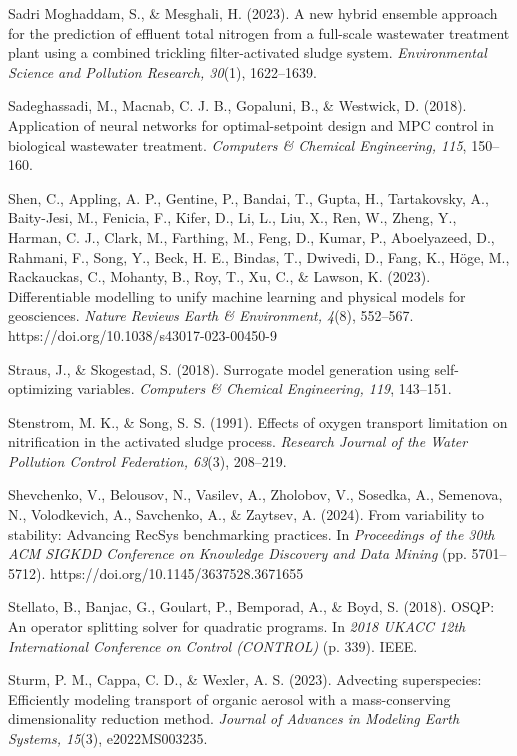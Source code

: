 \documentclass[a4paper,fleqn]{cas-sc}
\begin{document}
\noindent Sadri Moghaddam, S., \& Mesghali, H. (2023). A new hybrid ensemble approach for the prediction of effluent total nitrogen from a full-scale wastewater treatment plant using a combined trickling filter-activated sludge system. \textit{Environmental Science and Pollution Research, 30}(1), 1622--1639.

\noindent Sadeghassadi, M., Macnab, C. J. B., Gopaluni, B., \& Westwick, D. (2018). Application of neural networks for optimal-setpoint design and MPC control in biological wastewater treatment. \textit{Computers \& Chemical Engineering, 115}, 150--160.

\noindent Shen, C., Appling, A. P., Gentine, P., Bandai, T., Gupta, H., Tartakovsky, A., Baity-Jesi, M., Fenicia, F., Kifer, D., Li, L., Liu, X., Ren, W., Zheng, Y., Harman, C. J., Clark, M., Farthing, M., Feng, D., Kumar, P., Aboelyazeed, D., Rahmani, F., Song, Y., Beck, H. E., Bindas, T., Dwivedi, D., Fang, K., H\"oge, M., Rackauckas, C., Mohanty, B., Roy, T., Xu, C., \& Lawson, K. (2023). Differentiable modelling to unify machine learning and physical models for geosciences. \textit{Nature Reviews Earth \& Environment, 4}(8), 552--567. https://doi.org/10.1038/s43017-023-00450-9

\noindent Straus, J., \& Skogestad, S. (2018). Surrogate model generation using self-optimizing variables. \textit{Computers \& Chemical Engineering, 119}, 143--151.

\noindent Stenstrom, M. K., \& Song, S. S. (1991). Effects of oxygen transport limitation on nitrification in the activated sludge process. \textit{Research Journal of the Water Pollution Control Federation, 63}(3), 208--219.

\noindent Shevchenko, V., Belousov, N., Vasilev, A., Zholobov, V., Sosedka, A., Semenova, N., Volodkevich, A., Savchenko, A., \& Zaytsev, A. (2024). From variability to stability: Advancing RecSys benchmarking practices. In \textit{Proceedings of the 30th ACM SIGKDD Conference on Knowledge Discovery and Data Mining} (pp. 5701--5712). https://doi.org/10.1145/3637528.3671655

\noindent Stellato, B., Banjac, G., Goulart, P., Bemporad, A., \& Boyd, S. (2018). OSQP: An operator splitting solver for quadratic programs. In \textit{2018 UKACC 12th International Conference on Control (CONTROL)} (p. 339). IEEE.

\noindent Sturm, P. M., Cappa, C. D., \& Wexler, A. S. (2023). Advecting superspecies: Efficiently modeling transport of organic aerosol with a mass-conserving dimensionality reduction method. \textit{Journal of Advances in Modeling Earth Systems, 15}(3), e2022MS003235.
\end{document}
